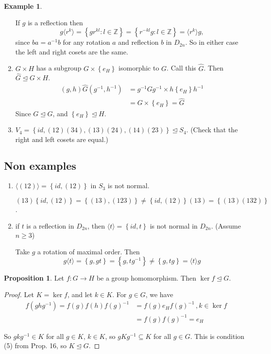 \documentclass{article}
\theoremstyle{definition}
\newtheorem{proposition}{Proposition}
\newtheorem*{exmp}{Example}
\newcommand{\gene}[1]{\langle #1 \rangle}
\newcommand{\nsg}[2]{#1 \trianglelefteq #2}
\newcommand{\func}[3]{#1 : #2 \rightarrow #3}
\begin{document}
\begin{exmp}
\begin{enumerate}
      If $g$ is a reflection then $$g\gene{r^k}=\left\{ gr^{kl}:l \in \mathbb{Z} \right\}=\left\{ r^{-kl}g:l \in \mathbb{Z} \right\}=\gene{r^k}g,$$ since $ba=a^{-1}b$ for any rotation $a$ and reflection $b$ in $D_{2n}$. So in either case the left and right cosets are the same.

    \item $G \times H$ has a subgroup  $G \times \left\{ e_H \right\}$ isomorphic to $G$. Call this $\hat{G}$. Then $\nsg{\hat{G}}{G \times H}$. 
\begin{align*}
  (g,h)\hat{G}(g^{-1},h^{-1}) &= g^{-1}Gg^{-1} \times h\left\{ e_H \right\}h^{-1} \\
  &= G \times \left\{ e_H \right\} = \hat{G}
\end{align*}
Since $\nsg{G}{G}$, and $\nsg{\left\{ e_H \right\}}{H}$.

\item $V_4 = \left\{ id,(12)(34), (13)(24),(14)(23) \right\} \trianglelefteq S_4$. (Check that the right and left cosets are equal.)
  \end{enumerate}
\end{exmp}

\subsection*{Non examples}
\begin{enumerate}
  \item $\gene{(12)}=\left\{ id,(12) \right\}$ in $S_3$ is not normal.

    $(13)\left\{ id, (12) \right\}=\left\{ (13),(123) \right\} \neq \left\{ id,(12) \right\}(13) = \left\{ (13)(132) \right\}$.

  \item if $t$ is a reflection in $D_{2n}$, then $\gene{t}=\left\{ id,t \right\}$ is not normal in $D_{2n}$. (Assume $n \geq 3$)

    Take $g$ a rotation of maximal order. Then 
    $$g\gene{t}=\left\{ g,gt \right\}=\left\{g,tg^{-1}\right\}\neq \left\{ g,tg \right\}=\gene{t}g$$
\end{enumerate}

\begin{proposition}
  Let $\func{f}{G}{H}$ be a group homomorphism. Then $\ker f \trianglelefteq G$. 
\end{proposition}

\begin{proof}
  Let $K = \ker f$, and let $k \in K$. For $g \in G$, we have 
  \begin{align*}
  f(ghg^{-1})=f(g)f(h)f(g)^{-1} &= f(g)e_Hf(g)^{-1} \,, k \in \ker f\\ &= f(g)f(g)^{-1} = e_H
  \end{align*}

  So $gkg^{-1} \in K$ for all $g \in K$, $k \in K$, so $gKg^{-1} \subseteq K$ for all $g \in G$. This is condition (5) from Prop. 16, so $K \trianglelefteq G$.
\end{proof}
\end{document}
